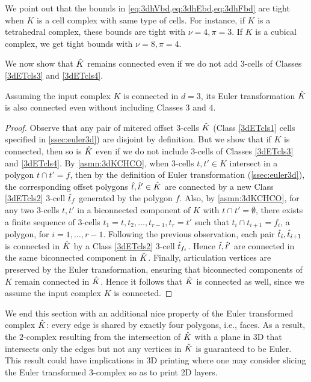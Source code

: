 We point out that the bounds in \cref{eq:3dhVbd,eq:3dhEbd,eq:3dhFbd} are tight when $K$ is a cell complex with same type of cells.
For instance, if $K$ is a tetrahedral complex, these bounds are tight with $\nu=4, \pi=3$.
If $K$ is a cubical complex, we get tight bounds with $\nu=8, \pi=4$.

\medskip
\noindent We now show that $\hat{K}$ remains connected even if we do not add $3$-cells of Classes \ref{3dETcls3} and \ref{3dETcls4}.

\begin{prop}
  \label{prop:hKcnctd3d}
  Assuming the input complex $K$ is connected in $d=3$, its Euler transformation $\hat{K}$ is also connected even without including Classes $3$ and $4$.
\end{prop}
\begin{proof}
  Observe that any pair of mitered offset $3$-cells $\hat{K}$ (Class \ref{3dETcls1} cells specified in \cref{ssec:euler3d}) are disjoint by definition.
  But we show that if $K$ is connected, then so is $\hat{K}$ even if we do not include $3$-cells of Classes \ref{3dETcls3} and \ref{3dETcls4}.
  By \cref{asmn:3dKCHCO}, when $3$-cells $t,t' \in K$ intersect in a polygon $t \cap t' = f$, then by the definition of Euler transformation (\cref{ssec:euler3d}), the corresponding offset polygons $\hat{t},\hat{t}' \in \hat{K}$ are connected by a new Class \ref{3dETcls2} $3$-cell $\hat{t}_{f}$ generated by the polygon $f$.
  Also, by \cref{asmn:3dKCHCO}, for any two $3$-cells $t,t'$ in a biconnected component of $K$ with $t \cap t' = \emptyset$, there exists a finite sequence of $3$-cells $t_1=t, t_2,\dots,t_{r-1},t_r=t'$ such that $t_i \cap t_{i+1} = f_i$, a polygon, for $i=1,\dots,r-1$.
  Following the previous observation, each pair $\hat{t}_i, \hat{t}_{i+1}$ is connected in $\hat{K}$ by a Class \ref{3dETcls2} $3$-cell $\hat{t}_{f_i}$.
  Hence $\hat{t},\hat{t}'$ are connected in the same biconnected component in $\hat{K}$.
  Finally, articulation vertices are preserved by the Euler transformation, ensuring that biconnected components of $K$ remain connected in $\hat{K}$.
  Hence it follows that $\hat{K}$ is connected as well, since we assume the input complex $K$ is connected.
\end{proof}

We end this section with an additional nice property of the Euler transformed complex $\hat{K}$: every edge is shared by exactly four polygons, i.e., faces.
As a result, the $2$-complex resulting from the intersection of $\hat{K}$ with a plane in 3D that intersects only the edges but not any vertices in $\hat{K}$ is guaranteed to be Euler.
This result could have implications in 3D printing where one may consider slicing the Euler transformed $3$-complex so as to print 2D layers.


